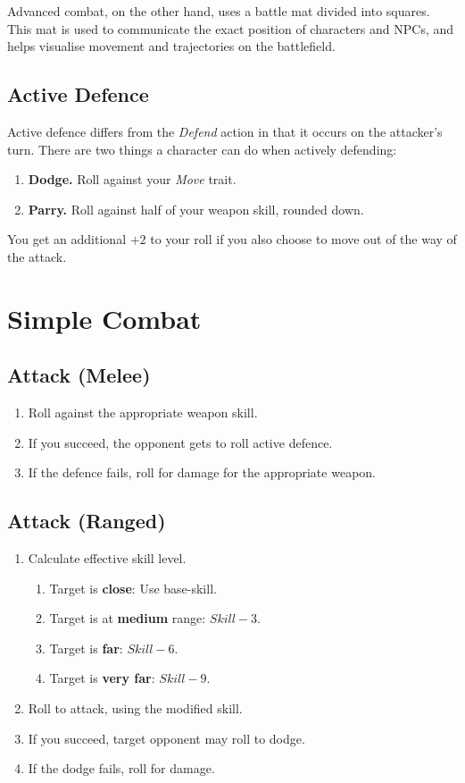 Advanced combat, on the other hand, uses a battle mat divided into squares. This mat is used to communicate the exact position of characters and NPCs, and helps visualise movement and trajectories on the battlefield.

\subsection{Active Defence}
Active defence differs from the \textit{Defend} action in that it occurs on the attacker's turn.
There are two things a character can do when actively defending:
\begin{enumerate}
    \item \textbf{Dodge.} Roll against your \textit{Move} trait.
    \item \textbf{Parry.} Roll against half of your weapon skill, rounded down.
\end{enumerate}
You get an additional $+2$ to your roll if you also choose to move out of the way of the attack.

\newpage
\section{Simple Combat}

\subsection{Attack (Melee)}
\begin{enumerate}
    \item Roll against the appropriate weapon skill.
    \item If you succeed, the opponent gets to roll active defence.
    \item If the defence fails, roll for damage for the appropriate weapon.
\end{enumerate}

\subsection{Attack (Ranged)}
\begin{enumerate}
    \item Calculate effective skill level.
        \begin{enumerate}
            \item Target is \textbf{close}: Use base-skill.
            \item Target is at \textbf{medium} range: $Skill-3$.
            \item Target is \textbf{far}: $Skill-6$.
            \item Target is \textbf{very far}: $Skill-9$.
        \end{enumerate}
    \item Roll to attack, using the modified skill.
    \item If you succeed, target opponent may roll to dodge.
    \item If the dodge fails, roll for damage.
\end{enumerate}

